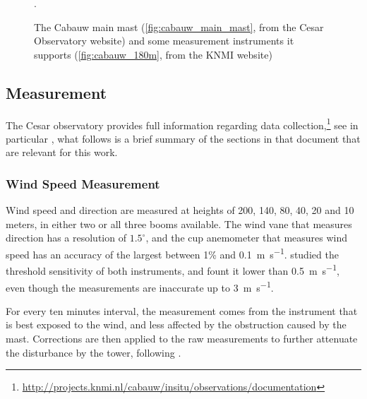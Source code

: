 \documentclass[a4paper,11pt]{kth-mag}
\begin{document}
\begin{figure}
\caption[The Cabauw main mast (\ref{fig:cabauw_main_mast}, from the Cesar Observatory website) and some measurement instruments it supports (\ref{fig:cabauw_180m}, from the KNMI website)]{The Cabauw main mast (\ref{fig:cabauw_main_mast}, from the Cesar Observatory website\protect\footnotemark) and some measurement instruments it supports (\ref{fig:cabauw_180m}, from the KNMI website\protect\footnotemark)}.
\label{fig:cabauw_tower}
\end{figure}


\subsection{Measurement}
\label{sec:measurement}
The Cesar observatory provides full information regarding data collection,\footnote{\url{http://projects.knmi.nl/cabauw/insitu/observations/documentation}} see in particular \cite{cabauwinsitu}, what follows is a brief summary of the sections in that document that are relevant for this work.


\subsubsection{Wind Speed Measurement}
Wind speed and direction are measured at heights of 200, 140, 80, 40, 20 and 10 meters, in either two or all three booms available. The wind vane that measures direction has a resolution of $1.5^\circ$, and the cup anemometer that measures wind speed has an accuracy of the largest between 1\% and \SI{0.1}{\meter\per\second}. \cite{windinstr} studied the threshold sensitivity of both instruments, and fount it lower than \SI{0.5}{\meter\per\second}, even though the measurements are inaccurate up to \SI{3}{\meter\per\second}.

For every ten minutes interval, the measurement comes from the instrument that is best exposed to the wind, and less affected by the obstruction caused by the mast. Corrections are then applied to the raw measurements to further attenuate the disturbance by the tower, following \cite{winddistortion}.

\end{document}
